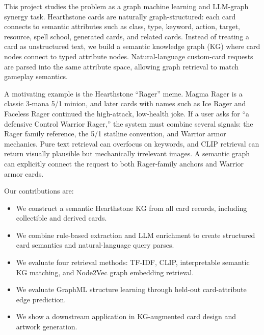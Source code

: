 \documentclass{article}
\begin{document}
This project studies the problem as a graph machine learning and LLM-graph synergy task. Hearthstone cards are naturally graph-structured: each card connects to semantic attributes such as class, type, keyword, action, target, resource, spell school, generated cards, and related cards. Instead of treating a card as unstructured text, we build a semantic knowledge graph (KG) where card nodes connect to typed attribute nodes. Natural-language custom-card requests are parsed into the same attribute space, allowing graph retrieval to match gameplay semantics.

A motivating example is the Hearthstone ``Rager'' meme. Magma Rager is a classic 3-mana 5/1 minion, and later cards with names such as Ice Rager and Faceless Rager continued the high-attack, low-health joke. If a user asks for ``a defensive Control Warrior Rager,'' the system must combine several signals: the Rager family reference, the 5/1 statline convention, and Warrior armor mechanics. Pure text retrieval can overfocus on keywords, and CLIP retrieval can return visually plausible but mechanically irrelevant images. A semantic graph can explicitly connect the request to both Rager-family anchors and Warrior armor cards.

Our contributions are:
\begin{itemize}
\item We construct a semantic Hearthstone KG from all card records, including collectible and derived cards.
\item We combine rule-based extraction and LLM enrichment to create structured card semantics and natural-language query parses.
\item We evaluate four retrieval methods: TF-IDF, CLIP, interpretable semantic KG matching, and Node2Vec graph embedding retrieval.
\item We evaluate GraphML structure learning through held-out card-attribute edge prediction.
\item We show a downstream application in KG-augmented card design and artwork generation.
\end{itemize}
\end{document}

